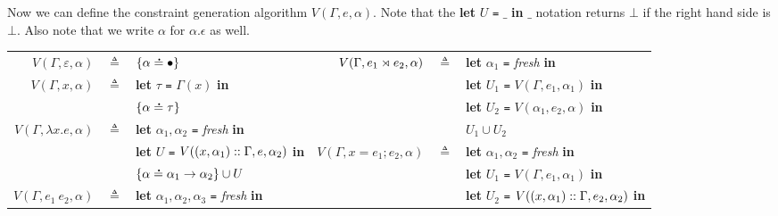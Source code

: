 Now we can define the constraint generation algorithm $V(\Gamma,e,\alpha)$.
Note that the \textbf{let} $U$ \texttt{=} $\_$ \textbf{in} $\_$ notation returns $\bot$ if the right hand side is $\bot$.
Also note that we write $\alpha$ for $\alpha.\epsilon$ as well.

  {\small
    \begin{flushright}\end{flushright}

    \begin{tabular}{@{\hskip0pt}r@{\hskip2pt}c@{\hskip2pt}l@{\hskip1pt}r@{\hskip2pt}c@{\hskip2pt}l}
      $V(\Gamma,\varepsilon,\alpha)$ & $\triangleq$ & $\{\alpha\overset{\,_{\mbox{\Large .}}}{=}\bullet\}$                                                             & $V(\Gamma,{e_1}\rtimes{e_2},\alpha)$ & $\triangleq$ & \textbf{let} $\alpha_1$ \texttt{=} \textit{fresh} \textbf{in}                       \\
      $V(\Gamma,x,\alpha)$           & $\triangleq$ & \textbf{let} $\tau$ \texttt{=} $\Gamma(x)$ \textbf{in}                               &                                    &              & \textbf{let} $U_1$ \texttt{=} $V(\Gamma,e_1,\alpha_1)$ \textbf{in}                  \\
                                     &              & $\{\alpha\overset{\,_{\mbox{\Large .}}}{=}\tau\}$                                                                &                                    &              & \textbf{let} $U_2$ \texttt{=} $V(\alpha_1,e_2,\alpha)$  \textbf{in}                 \\
      $V(\Gamma,\lambda x.e,\alpha)$ & $\triangleq$ & \textbf{let} $\alpha_1,\alpha_2$ \texttt{=} \textit{fresh} \textbf{in}               &                                    &              & $U_1\cup U_2$                                                                       \\
                                     &              & \textbf{let} $U$ \texttt{=} $V((x,\alpha_1)::\Gamma,e,\alpha_2)$ \textbf{in}      & $V(\Gamma,x=e_1;e_2,\alpha)$       & $\triangleq$ & \textbf{let} $\alpha_1,\alpha_2$ \texttt{=} \textit{fresh} \textbf{in}              \\
                                     &              & $\{\alpha\overset{\,_{\mbox{\Large .}}}{=}\alpha_1\rightarrow\alpha_2\}\cup U$                                   &                                    &              & \textbf{let} $U_1$ \texttt{=} $V(\Gamma,e_1,\alpha_1)$ \textbf{in}                  \\
      $V(\Gamma,e_1\:e_2,\alpha)$    & $\triangleq$ & \textbf{let} $\alpha_1,\alpha_2,\alpha_3$ \texttt{=} \textit{fresh} \textbf{in}      &                                    &              & \textbf{let} $U_2$ \texttt{=} $V((x,\alpha_1)::\Gamma,e_2,\alpha_2)$ \textbf{in} \\

\end{tabular}}
